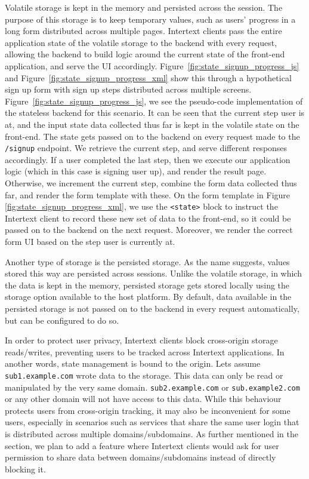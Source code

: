 Volatile storage is kept in the memory and persisted across the session. The purpose of this storage is to keep temporary values, such as users' progress in a long form distributed across multiple pages. Intertext clients pass the entire application state of the volatile storage to the backend with every request, allowing the backend to build logic around the current state of the front-end application, and serve the UI accordingly. Figure~\ref{fig:state_signup_progress_js} and Figure~\ref{fig:state_signup_progress_xml} show this through a hypothetical sign up form with sign up steps distributed across multiple screens. Figure~\ref{fig:state_signup_progress_js}, we see the pseudo-code implementation of the stateless backend for this scenario. It can be seen that the current step user is at, and the input state data collected thus far is kept in the volatile state on the front-end. The state gets passed on to the backend on every request made to the \texttt{/signup} endpoint. We retrieve the current step, and serve different responses accordingly. If a user completed the last step, then we execute our application logic (which in this case is signing user up), and render the result page. Otherwise, we increment the current step, combine the form data collected thus far, and render the form template with these. On the form template in Figure \ref{fig:state_signup_progress_xml}, we use the \texttt{<state>} block to instruct the Intertext client to record these new set of data to the front-end, so it could be passed on to the backend on the next request. Moreover, we render the correct form UI based on the step user is currently at.

Another type of storage is the persisted storage. As the name suggests, values stored this way are persisted across sessions. Unlike the volatile storage, in which the data is kept in the memory, persisted storage gets stored locally using the storage option available to the host platform. By default, data available in the persisted storage is not passed on to the backend in every request automatically, but can be configured to do so.

In order to protect user privacy, Intertext clients block cross-origin storage reads/writes, preventing users to be tracked across Intertext applications. In another words, state management is bound to the origin. Lets assume \texttt{sub1.example.com} wrote data to the storage. This data can only be read or manipulated by the very same domain. \texttt{sub2.example.com} or \newline\texttt{sub.example2.com} or any other domain will not have access to this data. While this behaviour protects users from cross-origin tracking, it may also be inconvenient for some users, especially in scenarios such as services that share the same user login that is distributed across multiple domains/subdomains. As further mentioned in the  section, we plan to add a feature where Intertext clients would ask for user permission to share data between domains/subdomains instead of directly blocking it.

